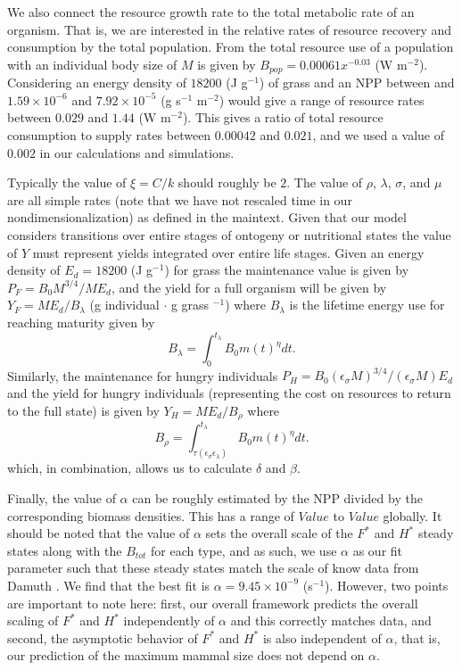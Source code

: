 \documentclass{pnastwo}
\begin{document}
\begin{article}
We also connect the resource growth rate to the total metabolic rate of an organism. That is, we are interested in the relative rates of resource recovery and consumption by the total population. From \cite{allen2002global} the total resource use of a population with an individual body size of $M$ is given by $B_{pop}=0.00061x^{-0.03}$ (W m$^{-2}$). Considering an energy density of $18200$ (J g$^{-1}$) of grass \cite{estermann} and an NPP between and $1.59\times10^{-6}$ and $7.92\times10^{-5}$ (g s$^{-1}$ m$^{-2}$) would give a range of resource rates between  $0.029$ and $1.44$ (W m$^{-2}$). This gives a ratio of total resource consumption to supply rates between $0.00042$ and $0.021$, and we used a value of $0.002$ in our calculations and simulations.

Typically the value of $\xi=C/k$ should roughly be $2$. The value of $\rho$, $\lambda$, $\sigma$, and $\mu$ are all simple rates (note that we have not rescaled time in our nondimensionalization) as defined in the maintext. Given that our model considers transitions over entire stages of ontogeny or nutritional states the value of $Y$ must represent yields integrated over entire life stages. Given an energy density of $E_{d}=18200$ (J g$^{-1}$) for grass \cite{estermann} the maintenance value is given by $P_{F}=B_{0}M^{3/4}/ME_{d}$, and the yield for a full organism will be given by $Y_{F}=ME_{d}/B_{\lambda}$ (g individual $\cdot$ g grass $^{-1}$) where $B_{\lambda}$ is the lifetime energy use for reaching maturity given by
\begin{equation}
B_{\lambda}=\int_{0}^{t_{\lambda}}B_{0}m\left(t\right)^{\eta}dt.
\end{equation}
Similarly, the maintenance for hungry individuals $P_{H}=B_{0}(\epsilon_{\sigma}M)^{3/4}/(\epsilon_{\sigma}M)E_{d}$ and the yield for hungry individuals (representing the cost on resources to return to the full state) is given by $Y_{H}=ME_{d}/B_{\rho}$ where
\begin{equation}
B_{\rho}=\int_{\tau\left(\epsilon_{\sigma}\epsilon_{\lambda}\right)}^{t_{\lambda}}B_{0}m\left(t\right)^{\eta}dt.
\end{equation}
which, in combination, allows us to calculate $\delta$ and $\beta$.

Finally, the value of $\alpha$ can be roughly estimated by the NPP divided by the corresponding biomass densities. This has a range of $Value$ to $Value$ globally. It should be noted that the value of $\alpha$ sets the overall scale of the $F^{*}$ and $H^{*}$ steady states along with the $B_{tot}$ for each type, and as such, we use $\alpha$ as our fit parameter such that these steady states match the scale of know data from Damuth \cite{damuth1987interspecific}. We find that the best fit is $\alpha=9.45\times10^{-9}$ (s$^{-1}$). However, two points are important to note here: first, our overall framework predicts the overall scaling of $F^{*}$ and $H^{*}$ independently of $\alpha$ and this correctly matches data, and second, the asymptotic behavior of $F^{*}$ and $H^{*}$ is also independent of $\alpha$, that is, our prediction of the maximum mammal size does not depend on $\alpha$.


\end{article}
\end{document}
